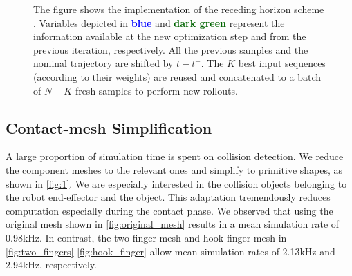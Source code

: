\begin{figure}[t]
    \vspace{0.1cm}
    \caption{The figure shows the implementation of the receding horizon scheme . Variables depicted in \textcolor{blue}{\textbf{blue}} and \textcolor{darkgreen}{\textbf{dark green}} represent the information available at the new optimization step and from the previous iteration, respectively. All the previous samples and the nominal trajectory are shifted by $ t - t^-$. The $K$ best input sequences (according to their weights) are reused and concatenated to a batch of $N-K$ fresh samples to perform new rollouts. }
    \label{fig:receding_horizon}
\end{figure}

\subsection{Contact-mesh Simplification}
A large proportion of simulation time is spent on collision detection. We reduce the component meshes to the relevant ones and simplify to primitive shapes, as shown in \fig\ref{fig:1}. We are especially interested in the collision objects belonging to the robot end-effector and the object. This adaptation tremendously reduces computation especially during the contact phase.  We observed that using the original mesh shown in \fig\ref{fig:original_mesh} results in a mean simulation rate of 0.98kHz. In contrast, the two finger mesh and hook finger mesh in \fig\ref{fig:two_fingers}-\ref{fig:hook_finger} allow mean simulation rates of 2.13kHz and 2.94kHz, respectively.

